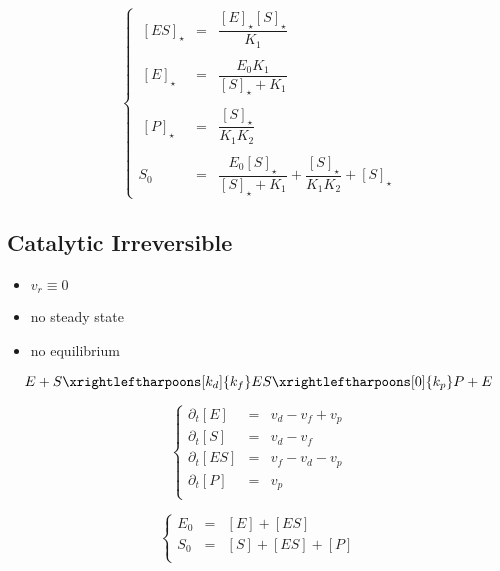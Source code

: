 \documentclass[aps,12pt]{revtex4}
\begin{document}
\begin{equation}
\left\lbrace
\begin{array}{rcl}
 		~[ES]_\star & = & \dfrac{[E]_\star[S]_\star}{K_1} \\
		\\
		~[E]_\star  & = & \dfrac{E_0K_1}{ [S]_\star + K_1} \\
		\\
		~[P]_\star  & = & \dfrac{[S]_\star}{K_1K_2}\\
		\\
		S_0 & = & \dfrac{E_0 [S]_\star}{[S]_\star+K_1} + \dfrac{[S]_\star}{K_1K_2} + [S]_\star
\end{array}
\right.
\end{equation}

\subsection{Catalytic Irreversible}

\begin{itemize}
	\item $v_r\equiv 0$
	\item no steady state
	\item no equilibrium
\end{itemize}

\begin{equation}
	E + S \xrightleftharpoons[k_d]{k_f} ES 
	\xrightleftharpoons[0]{k_p} P + E
\end{equation}

\begin{equation}
\left\lbrace
\begin{array}{rcl}
  \partial_t [E]  & = & v_d - v_f + v_p \\
  \partial_t [S]  & = & v_d - v_f \\
  \partial_t [ES] & = & v_f - v_d - v_p \\ 
  \partial_t [P]  & = & v_p \\
\end{array}
\right.
\end{equation}

\begin{equation}
\left\lbrace
\begin{array}{rcl}
 E_0 & = & [E] + [ES]\\
 S_0 & = & [S] + [ES] + [P] \\ %
 \end{array}
 \right.
\end{equation}
\end{document}
